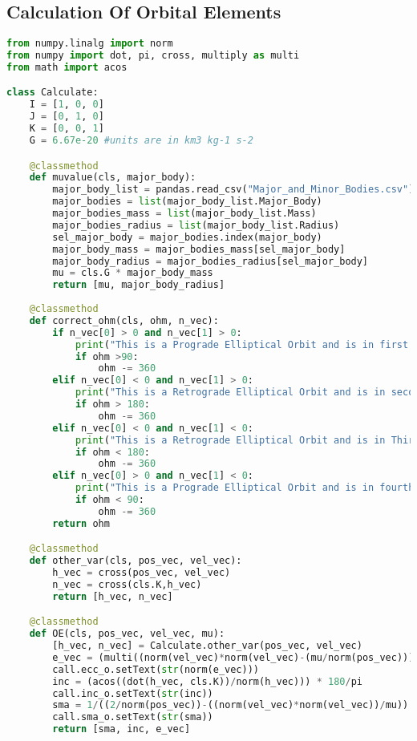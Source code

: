 \subsection{Calculation Of Orbital Elements}
\begin{lstlisting}[language=python, caption=CoOE.py]
from numpy.linalg import norm
from numpy import dot, pi, cross, multiply as multi
from math import acos

class Calculate:
    I = [1, 0, 0]
    J = [0, 1, 0]
    K = [0, 0, 1]
    G = 6.67e-20 #units are in km3 kg-1 s-2

    @classmethod
    def muvalue(cls, major_body):
        major_body_list = pandas.read_csv("Major_and_Minor_Bodies.csv")
        major_bodies = list(major_body_list.Major_Body)
        major_bodies_mass = list(major_body_list.Mass)
        major_bodies_radius = list(major_body_list.Radius)        
        sel_major_body = major_bodies.index(major_body)
        major_body_mass = major_bodies_mass[sel_major_body]
        major_body_radius = major_bodies_radius[sel_major_body]
        mu = cls.G * major_body_mass
        return [mu, major_body_radius]
    
    @classmethod
    def correct_ohm(cls, ohm, n_vec):
        if n_vec[0] > 0 and n_vec[1] > 0: 
            print("This is a Prograde Elliptical Orbit and is in first Quadrant.")
            if ohm >90:
                ohm -= 360
        elif n_vec[0] < 0 and n_vec[1] > 0:
            print("This is a Retrograde Elliptical Orbit and is in second Quadrant.")
            if ohm > 180:
                ohm -= 360
        elif n_vec[0] < 0 and n_vec[1] < 0:
            print("This is a Retrograde Elliptical Orbit and is in Third Quadrant.")
            if ohm < 180:
                ohm -= 360
        elif n_vec[0] > 0 and n_vec[1] < 0:
            print("This is a Prograde Elliptical Orbit and is in fourth Quadrant.")
            if ohm < 90:
                ohm -= 360
        return ohm

    @classmethod
    def other_var(cls, pos_vec, vel_vec):
        h_vec = cross(pos_vec, vel_vec)
        n_vec = cross(cls.K,h_vec)
        return [h_vec, n_vec]

    @classmethod
    def OE(cls, pos_vec, vel_vec, mu):
        [h_vec, n_vec] = Calculate.other_var(pos_vec, vel_vec)
        e_vec = (multi((norm(vel_vec)*norm(vel_vec)-(mu/norm(pos_vec))),pos_vec)- multi(dot(pos_vec,vel_vec),vel_vec))/(mu)
        call.ecc_o.setText(str(norm(e_vec)))
        inc = (acos((dot(h_vec, cls.K))/norm(h_vec))) * 180/pi
        call.inc_o.setText(str(inc))
        sma = 1/((2/norm(pos_vec))-((norm(vel_vec)*norm(vel_vec))/mu))
        call.sma_o.setText(str(sma))
        return [sma, inc, e_vec]
    

\end{lstlisting}
